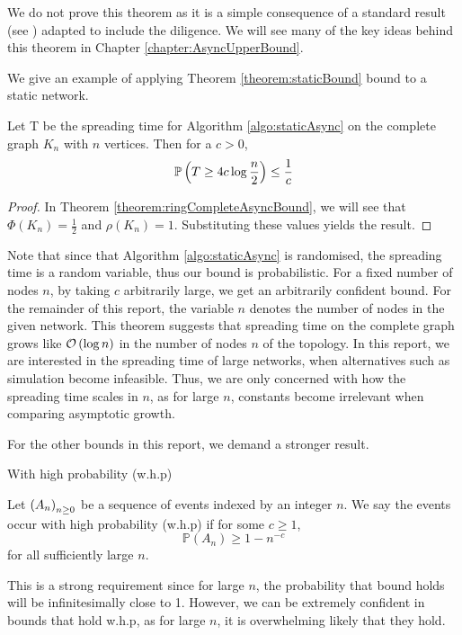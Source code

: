 We do not prove this theorem as it is a simple consequence of a standard result (see \cite{complexNetworksRumourSpreading}) adapted to include the diligence. We will see many of the key ideas behind this theorem in Chapter \ref{chapter:AsyncUpperBound}.

We give an example of applying Theorem \ref{theorem:staticBound} bound to a static network.

\begin{theorem}
	Let T be the spreading time for Algorithm \ref{algo:staticAsync} on the complete graph $K_n$ with $n$ vertices. Then for a $c > 0$,
	$$
		\mathbb{P}\left( T \geq 4c \log \frac{n}{2} \right) \leq \frac{1}{c} 
	$$
\end{theorem}

\begin{proof}
	In Theorem \ref{theorem:ringCompleteAsyncBound}, we will see that $\Phi(K_n) = \frac{1}{2}$ and $\rho(K_n) = 1$. Substituting these values yields the result.
\end{proof}

Note that since that Algorithm \ref{algo:staticAsync} is randomised, the spreading time is a random variable, thus our bound is probabilistic. 
For a fixed number of nodes $n$, by taking $c$ arbitrarily large, we get an arbitrarily confident bound.
For the remainder of this report, the variable $n$ denotes the number of nodes in the given network.
This theorem suggests that spreading time on the complete graph grows like 
$
	\mathcal{O} \left( \log n \right)
$
in the number of nodes $n$ of the topology. In this report, we are interested in the spreading time of large networks, when alternatives such as simulation become infeasible. Thus, we are only concerned with how the spreading time scales in $n$, as for large $n$, constants become irrelevant when comparing asymptotic growth.

For the other bounds in this report, we demand a stronger result.

\begin{definition}
	With high probability (w.h.p)

	\noindent
	Let $\left( A_n \right)_{n \geq 0}$ be a sequence of events indexed by an integer $n$. We say the events occur with high probability (w.h.p) if for some $c \geq 1$, 
	$$
		\mathbb{P}(A_n) \geq 1 - n^{-c}
	$$ for all sufficiently large $n$.
\end{definition}

This is a strong requirement since for large $n$, the probability that bound holds will be infinitesimally close to 1. However, we can be extremely confident in bounds that hold w.h.p, as for large $n$, it is overwhelming likely that they hold.
